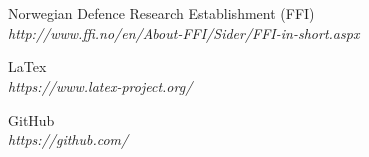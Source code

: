 \section *  {}

\begin{thebibliography}{9}


             Norwegian Defence Research Establishment (FFI) \\ 
\textit{http://www.ffi.no/en/About-FFI/Sider/FFI-in-short.aspx}

             LaTex \\ 
\textit{https://www.latex-project.org/}

             GitHub \\ 
\textit{https://github.com/}



\end{thebibliography}






